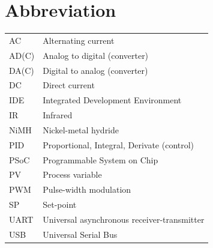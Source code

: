 \documentclass[11pt,a4paper,oneside,article]{memoir}
\begin{document}


\pagestyle{empty} %
\tableofcontents*
\pagestyle{empty} %
\clearpage
\pagestyle{plain}




\pagestyle{empty}
\setlength{\parskip}{1cm}
\chapter*{Abbreviation}
\begin{table}[h]
\setlength{\tabcolsep}{8pt}
\renewcommand{\arraystretch}{2}
\begin{tabular}{l p{12cm}}
AC	& Alternating current\\
AD(C)	& Analog to digital (converter)\\
DA(C)	& Digital to analog (converter)\\
DC	& Direct current\\
IDE	& Integrated Development Environment\\
IR	& Infrared\\
NiMH	& Nickel-metal hydride\\
PID & Proportional, Integral, Derivate (control)\\
PSoC	& Programmable System on Chip\\
PV	& Process variable\\
PWM & Pulse-width modulation\\
SP	& Set-point\\
UART	& Universal asynchronous receiver-transmitter\\
USB	& Universal Serial Bus\\

\end{tabular}
\end{table}
\end{document}
